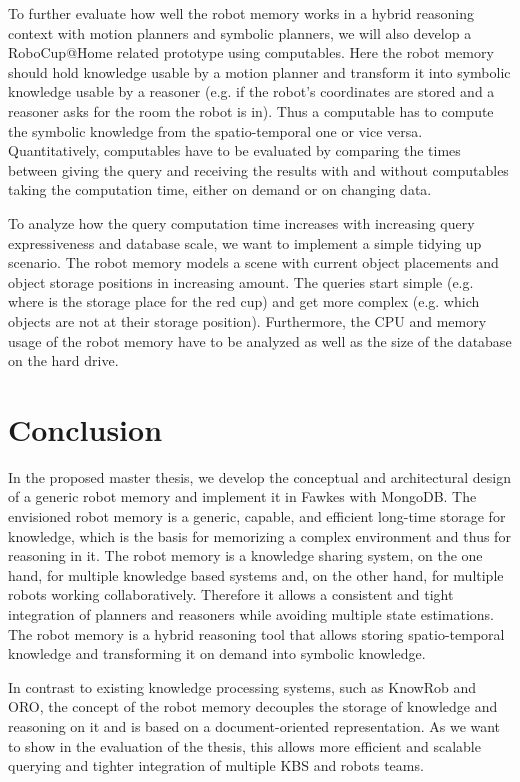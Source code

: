 \documentclass[a4paper,11pt]{article}
\begin{document}
To further evaluate how well the robot memory works in a hybrid
reasoning context with motion planners and symbolic planners, we will
also develop a RoboCup@Home related prototype using computables. Here
the robot memory should hold knowledge usable by a motion planner and
transform it into symbolic knowledge usable by a reasoner (e.g. if the
robot's coordinates are stored and a reasoner asks for the room the
robot is in). Thus a computable has to compute the symbolic knowledge
from the spatio-temporal one or vice versa. Quantitatively,
computables have to be evaluated by comparing the times between giving
the query and receiving the results with and without computables
taking the computation time, either on demand or on changing data.

To analyze how the query computation time increases with increasing query
expressiveness and database scale, we want to implement a simple
tidying up scenario. The robot memory models a scene with current
object placements and object storage positions in increasing
amount. The queries start simple (e.g. where is the storage place for
the red cup) and get more complex (e.g. which objects are not at their
storage position). Furthermore, the CPU and memory usage of the robot
memory have to be analyzed as well as the size of the database on the
hard drive.

\section{Conclusion}
\label{sec:conclusion}
In the proposed master thesis, we develop the conceptual and
architectural design of a generic robot memory and implement it in
Fawkes with MongoDB. The envisioned robot memory is a generic,
capable, and efficient long-time storage for knowledge, which is the
basis for memorizing a complex environment and thus for reasoning in
it. The robot memory is a knowledge sharing system, on the one hand,
for multiple knowledge based systems and, on the other hand, for
multiple robots working collaboratively. Therefore it allows a
consistent and tight integration of planners and reasoners while
avoiding multiple state estimations. The robot memory is a hybrid
reasoning tool that allows storing spatio-temporal knowledge and
transforming it on demand into symbolic knowledge.

In contrast to existing knowledge processing systems, such as KnowRob
and ORO, the concept of the robot memory decouples the storage of
knowledge and reasoning on it and is based on a document-oriented
representation. As we want to show in the evaluation of the thesis,
this allows more efficient and scalable querying and tighter
integration of multiple KBS and robots teams.
\end{document}

